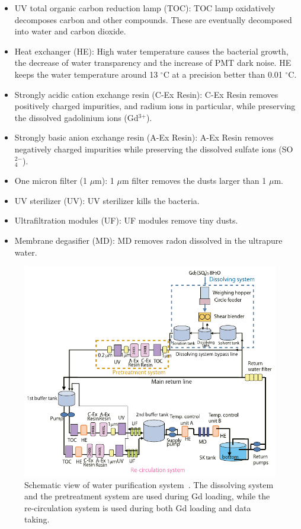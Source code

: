 \begin{itemize}
	\item UV total organic carbon reduction lamp (TOC): TOC lamp oxidatively decomposes carbon and other compounds. These are eventually decomposed into water and carbon dioxide.
	\item Heat exchanger (HE): High water temperature causes the bacterial growth, the decrease of water transparency and the increase of PMT dark noise. HE keeps the water temperature around 13 $^{\circ}$C at a precision better than 0.01 $^{\circ}$C.
	\item Strongly acidic cation exchange resin (C-Ex Resin): C-Ex Resin removes positively charged impurities, and radium ions in particular, while preserving the dissolved gadolinium ions (Gd$^{\text{3}+}$).
	\item Strongly basic anion exchange resin (A-Ex Resin): A-Ex Resin removes negatively charged impurities while preserving the dissolved sulfate ions (SO$^{\text{2}-}_{\text{4}}$).
	\item One micron filter (1 $\mu$m): 1 $\mu$m filter removes the dusts larger than 1 $\mu$m.
	\item UV sterilizer (UV): UV sterilizer kills the bacteria.
	\item Ultrafiltration modules (UF): UF modules remove tiny dusts.
	\item Membrane degasifier (MD): MD removes radon dissolved in the ultrapure water.
\end{itemize}

\begin{figure}[tbp]
	\centering
	\includegraphics[width=15cm]{Figures/002/F13_Water}
	\caption[Schematic view of water purification system]{\label{002_F13_Water} Schematic view of water purification system~\cite{2022Abe}. The dissolving system and the pretreatment system are used during Gd loading, while the re-circulation system is used during both Gd loading and data taking.}
\end{figure}

